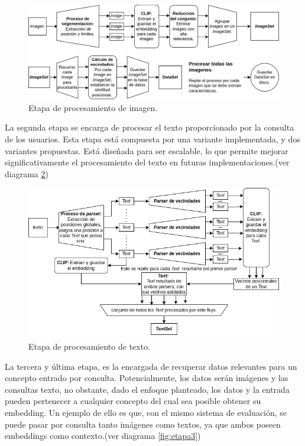 \begin{figure}[H]
\centering
\includegraphics[width=\textwidth]{Graphics/Image.drawio.png}
\caption{Etapa de procesamiento de imagen.}
\label{fig:etapa1}
\end{figure}

La segunda etapa se encarga de procesar el texto proporcionado por la consulta de los usuarios. Esta etapa está compuesta por una variante implementada, y dos variantes propuestas. Está diseñada para ser escalable, lo que permite mejorar significativamente el procesamiento del texto en futuras implementaciones.(ver diagrama \ref{fig:etapa2})


\begin{figure}[H]
    \centering
    \includegraphics[width=\textwidth]{Graphics/Text.drawio.png}
\caption{Etapa de procesamiento de texto.}
\label{fig:etapa2}
    \end{figure}

La tercera y \'ultima etapa, es la encargada de recuperar datos relevantes para un concepto entrado por consulta. Potencialmente, los datos ser\'an im\'agenes y las consultas texto, no obstante, dado el enfoque planteado, los datos y la entrada pueden pertenecer a cualquier concepto del cual sea posible obtener su embedding. Un ejemplo de ello es que, con el mismo sistema de evaluaci\'on, se puede pasar por consulta tanto imágenes como textos, ya que ambos poseen embeddings como contexto.(ver diagrama \ref{fig:etapa3})

